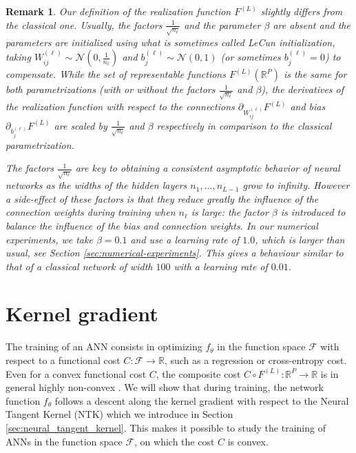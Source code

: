 \documentclass{article}
\newtheorem{rem}{Remark}
\begin{document}
\begin{rem}\label{rem:parametrization}
Our definition of the realization function $F^{(L)}$ slightly differs from the classical one. Usually, the factors $\frac{1}{\sqrt{n_\ell}}$ and the parameter $\beta$ are absent and the parameters are initialized using what is sometimes called LeCun initialization, taking $W^{(\ell)}_{ij} \sim \mathcal{N}(0, \frac{1}{n_\ell})$ and $b^{(\ell)}_{j} \sim \mathcal{N}(0, 1)$ (or sometimes $b^{(\ell)}_{j} = 0$) to compensate. While the set of representable functions $F^{(L)}(\mathbb{R}^P)$ is the same for both parametrizations (with or without the factors $\frac{1}{\sqrt{n_\ell}}$ and $\beta$), the derivatives of the realization function with respect to the connections $\partial_{W_{ij}^{(\ell)}} F^{(L)}$ and bias $\partial_{b_{j}^{(\ell)}} F^{(L)}$ are scaled by $\frac{1}{\sqrt{n_\ell}}$ and $\beta$ respectively in comparison to the classical parametrization.

The factors $\frac{1}{\sqrt{n_\ell}}$ are key to obtaining a consistent asymptotic behavior of neural networks as the widths of the hidden layers $n_1, ..., n_{L-1}$ grow to infinity. However a side-effect of these factors is that they reduce greatly the influence of the connection weights during training when $n_\ell$ is large: the factor $\beta$ is introduced to balance the influence of the bias and connection weights. In our numerical experiments, we take $\beta=0.1$ and use a learning rate of $1.0$, which is larger than usual, see Section \ref{sec:numerical-experiments}. This gives a behaviour similar to that of a classical network of width $100$ with a learning rate of $0.01$.
\end{rem}

\section{Kernel gradient}\label{sec:kernel_gradient}
The training of an ANN consists in optimizing $f_\theta$ in the function space $\mathcal{F}$ with respect to a functional cost $C : \mathcal{F} \to \mathbb{R}$, such as a regression or cross-entropy cost. Even for a convex functional cost $C$, the composite cost $C \circ F^{(L)} : \mathbb{R}^P \to \mathbb{R}$ is in general highly non-convex \citep{Choromanska}. We will show that during training, the network function $f_\theta$ follows a descent along the kernel gradient with respect to the Neural Tangent Kernel (NTK) which we introduce in Section \ref{sec:neural_tangent_kernel}. This makes it possible to study the training of ANNs in the function space $\mathcal{F}$, on which the cost $C$ is convex.
\end{document}
